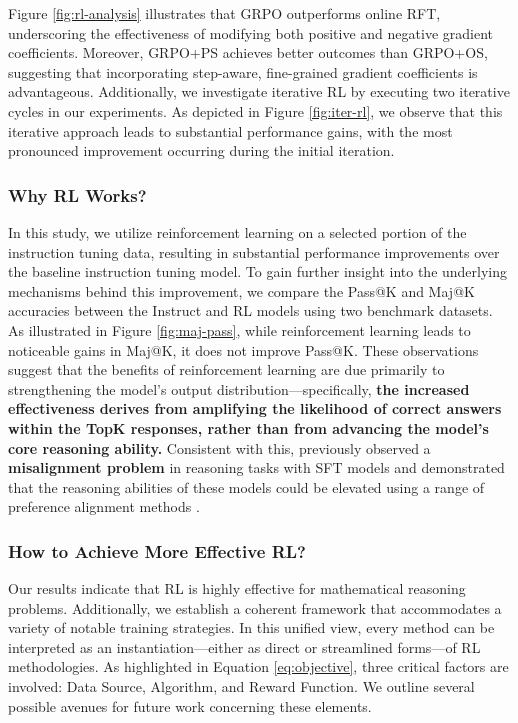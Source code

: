 \begin{itemize}[topsep=0pt]
\begin{itemize}[topsep=0pt]
Figure \ref{fig:rl-analysis} illustrates that GRPO outperforms online RFT, underscoring the effectiveness of modifying both positive and negative gradient coefficients. Moreover, GRPO+PS achieves better outcomes than GRPO+OS, suggesting that incorporating step-aware, fine-grained gradient coefficients is advantageous. Additionally, we investigate iterative RL by executing two iterative cycles in our experiments. As depicted in Figure \ref{fig:iter-rl}, we observe that this iterative approach leads to substantial performance gains, with the most pronounced improvement occurring during the initial iteration.

\subsubsection{Why RL Works?} In this study, we utilize reinforcement learning on a selected portion of the instruction tuning data, resulting in substantial performance improvements over the baseline instruction tuning model. To gain further insight into the underlying mechanisms behind this improvement, we compare the Pass@K and Maj@K accuracies between the Instruct and RL models using two benchmark datasets. As illustrated in Figure \ref{fig:maj-pass}, while reinforcement learning leads to noticeable gains in Maj@K, it does not improve Pass@K. These observations suggest that the benefits of reinforcement learning are due primarily to strengthening the model's output distribution—specifically, \textbf{the increased effectiveness derives from amplifying the likelihood of correct answers within the TopK responses, rather than from advancing the model’s core reasoning ability.} Consistent with this, \citep{wang2023making} previously observed a \textbf{misalignment problem} in reasoning tasks with SFT models and demonstrated that the reasoning abilities of these models could be elevated using a range of preference alignment methods \citep{yuan2023rrhf,song2023preference,wang2023making}.

\subsubsection{How to Achieve More Effective RL?}
\label{sec:effec_rl}
Our results indicate that RL is highly effective for mathematical reasoning problems. Additionally, we establish a coherent framework that accommodates a variety of notable training strategies. In this unified view, every method can be interpreted as an instantiation—either as direct or streamlined forms—of RL methodologies. As highlighted in Equation \ref{eq:objective}, three critical factors are involved: Data Source, Algorithm, and Reward Function. We outline several possible avenues for future work concerning these elements.


\end{itemize}
\end{itemize}
